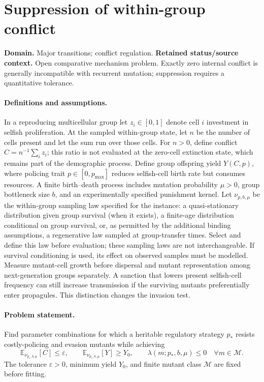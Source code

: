\documentclass[11pt]{article}
\begin{document}
\section*{Suppression of within-group conflict}
\label{prob:154}
\label{rank:154}
\par\smallskip

\noindent\textbf{Domain.} Major transitions; conflict regulation. \quad \textbf{Retained status/source context.} Open comparative mechanism problem. Exactly zero internal conflict is generally incompatible with recurrent mutation; suppression requires a quantitative tolerance.
\paragraph{Definitions and assumptions.} In a reproducing multicellular group let $z_i\in[0,1]$ denote cell $i$ investment in selfish proliferation. At the sampled within-group state, let $n$ be the number of cells present and let the sum run over those cells. For $n>0$, define conflict $C=n^{-1}\sum_i z_i$; this ratio is not evaluated at the zero-cell extinction state, which remains part of the demographic process. Define group offspring yield $Y(C,p)$, where policing trait $p\in[0,p_{\max}]$ reduces selfish-cell birth rate but consumes resources. A finite birth--death process includes mutation probability $\mu>0$, group bottleneck size $b$, and an experimentally specified punishment kernel. Let $\nu_{p,b,\mu}$ be the within-group sampling law specified for the instance: a quasi-stationary distribution given group survival (when it exists), a finite-age distribution conditional on group survival, or, as permitted by the additional binding assumptions, a regenerative law sampled at group-transfer times. Select and define this law before evaluation; these sampling laws are not interchangeable. If survival conditioning is used, its effect on observed samples must be modelled. Measure mutant-cell growth before dispersal and mutant representation among next-generation groups separately. A sanction that lowers present selfish-cell frequency can still increase transmission if the surviving mutants preferentially enter propagules. This distinction changes the invasion test.
\paragraph{Problem statement.} Find parameter combinations for which a heritable regulatory strategy $p_*$ resists costly-policing and evasion mutants while achieving
\[
 \mathbb{E}_{\nu_{p_*,b,\mu}}[C]\le\varepsilon,
 \qquad \mathbb{E}_{\nu_{p_*,b,\mu}}[Y]\ge Y_0,
 \qquad \lambda(m;p_*,b,\mu)\le0\quad\forall m\in\mathcal M.
\]
The tolerance $\varepsilon>0$, minimum yield $Y_0$, and finite mutant class $\mathcal M$ are fixed before fitting.
\end{document}
